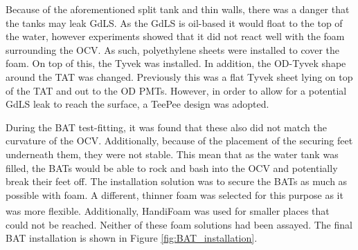 \par
Because of the aforementioned split tank and thin walls, there was a danger that the tanks may leak GdLS.
As the GdLS is oil-based it would float to the top of the water, however experiments showed that it did not react well with the foam surrounding the OCV.
As such, polyethylene sheets were installed to cover the foam. 
On top of this, the Tyvek was installed.
In addition, the OD-Tyvek shape around the TAT was changed.
Previously this was a flat Tyvek sheet lying on top of the TAT and out to the OD PMTs.
However, in order to allow for a potential GdLS leak to reach the surface, a TeePee design was adopted.


\par
During the BAT test-fitting, it was found that these also did not match the curvature of the OCV.
Additionally, because of the placement of the securing feet underneath them, they were not stable.
This mean that as the water tank was filled, the BATs would be able to rock and bash into the OCV and potentially break their feet off.
The installation solution was to secure the BATs as much as possible with foam.
A different, thinner foam was selected for this purpose as it was more flexible.
Additionally, HandiFoam\textsuperscript{\textregistered} was used for smaller places that could not be reached.
Neither of these foam solutions had been assayed.
The final BAT installation is shown in Figure \ref{fig:BAT_installation}.

